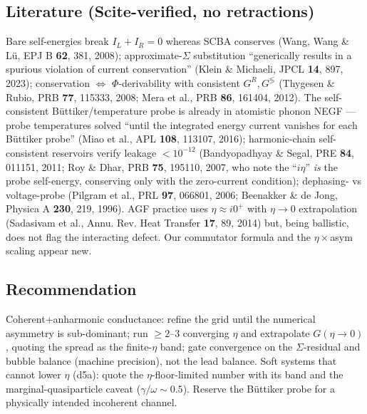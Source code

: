 \documentclass[11pt]{article}
\begin{document}
\subsection{Literature (Scite-verified, no retractions)}
Bare self-energies break $I_L+I_R=0$ whereas SCBA conserves (Wang, Wang \&
L\"u, EPJ B \textbf{62}, 381, 2008); approximate-$\Sigma$ substitution
``generically results in a spurious violation of current conservation''
(Klein \& Michaeli, JPCL \textbf{14}, 897, 2023); conservation
$\Leftrightarrow$ $\Phi$-derivability with consistent $G^{R},G^{\lessgtr}$
(Thygesen \& Rubio, PRB \textbf{77}, 115333, 2008; Mera et al., PRB
\textbf{86}, 161404, 2012). The self-consistent B\"uttiker/temperature probe
is already in atomistic phonon NEGF --- probe temperatures solved ``until the
integrated energy current vanishes for each B\"uttiker probe'' (Miao et al.,
APL \textbf{108}, 113107, 2016); harmonic-chain self-consistent reservoirs
verify leakage $<10^{-12}$ (Bandyopadhyay \& Segal, PRE \textbf{84}, 011151,
2011; Roy \& Dhar, PRB \textbf{75}, 195110, 2007, who note the ``$i\eta$''
\emph{is} the probe self-energy, conserving only with the zero-current
condition); dephasing- vs voltage-probe (Pilgram et al., PRL \textbf{97},
066801, 2006; Beenakker \& de Jong, Physica A \textbf{230}, 219, 1996). AGF
practice uses $\eta\approx i0^+$ with $\eta\to0$ extrapolation (Sadasivam
et al., Annu. Rev. Heat Transfer \textbf{17}, 89, 2014) but, being ballistic,
does not flag the interacting defect. Our commutator formula and the
$\eta\times$asym scaling appear new.

\subsection{Recommendation}
Coherent+anharmonic conductance: refine the grid until the numerical asymmetry
is sub-dominant; run $\ge2$--$3$ converging $\eta$ and extrapolate
$G(\eta\to0)$, quoting the spread as the finite-$\eta$ band; gate convergence
on the $\Sigma$-residual and bubble balance (machine precision), not the lead
balance. Soft systems that cannot lower $\eta$ (d5a): quote the
$\eta$-floor-limited number with its band and the marginal-quasiparticle
caveat ($\gamma/\omega\sim0.5$). Reserve the B\"uttiker probe for a physically
intended incoherent channel.
\end{document}
